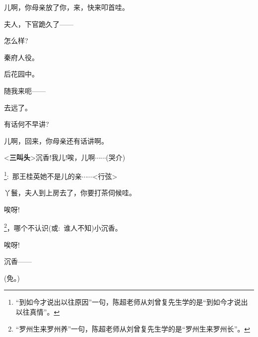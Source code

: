 {儿啊，你母亲放了你，来，快来叩首哇。}

{夫人，下官跪久了------}

{怎么样?}\hspace{10pt}~


{秦府人役。}

{后花园中。}

{随我来呃------}

{去远了。}\hspace{10pt}~

{有话何不早讲?}

{儿啊，回来，你母亲还有话讲啊。}

{\textless{}{\!\bfseries\akai 三叫头}\!\textgreater{}沉香!我儿!唉，儿啊$\cdots{}\cdots{}$({\hwfs 哭}{\hwfs 介})}

\footnote{{``到如今才说出以往原因''一句，}陈超老师从刘曾复先生学的是``{到如今才说出以往真情}''。}{:~那王桂英她不是儿的亲$\cdots{}\cdots{}$\textless{}行弦\textgreater{}}

{丫鬟，夫人到上房去了，你要打茶伺候哇。}




{唉呀!}\hspace{20pt}~

\footnote{{``罗州生来罗州养''一句，}陈超老师从刘曾复先生学的是``{罗州生来罗州长}''。}{，哪个不认识(或:~谁人不知)小沉香。}

{唉呀!}\hspace{20pt}~



{沉香------}\hspace{10pt}~

{(免。)}\hspace{20pt}~


